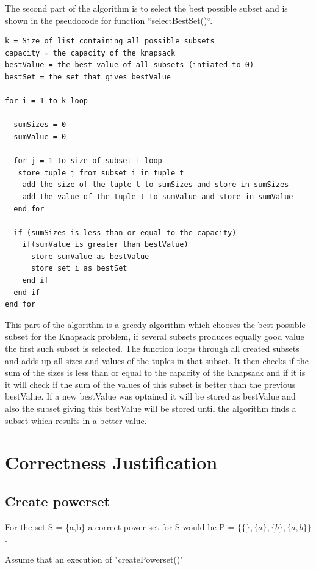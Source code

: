 \documentclass{inc/mas}
\begin{document}
The second part of the algorithm is to select the best possible subset and is shown in the pseudocode for function ``selectBestSet()``.\\

\begin{lstlisting}
k = Size of list containing all possible subsets
capacity = the capacity of the knapsack
bestValue = the best value of all subsets (intiated to 0)
bestSet = the set that gives bestValue

for i = 1 to k loop

  sumSizes = 0
  sumValue = 0

  for j = 1 to size of subset i loop
   store tuple j from subset i in tuple t
    add the size of the tuple t to sumSizes and store in sumSizes
    add the value of the tuple t to sumValue and store in sumValue
  end for

  if (sumSizes is less than or equal to the capacity)
    if(sumValue is greater than bestValue)
      store sumValue as bestValue
      store set i as bestSet
    end if
  end if
end for
\end{lstlisting}

\noindent This part of the algorithm is a greedy algorithm which chooses the best possible subset for the Knapsack problem, if several subsets produces equally good value the first such subset is selected. The function loops through all created subsets and adds up all sizes and values of the tuples in that subset. It then checks if the sum of the sizes is less than or equal to the capacity of the Knapsack and if it is it will check if the sum of the values of this subset is better than the previous bestValue. If a new bestValue was optained it will be stored as bestValue and also the subset giving this bestValue will be stored until the algorithm finds a subset which results in a better value.\\

\section{Correctness Justification}

\subsection{Create powerset}

For the set S = \{a,b\} a correct power set for S would be P = $\{\{\},\{a\},\{b\},\{a,b\}\}$.

Assume that an execution of "createPowerset()"
\end{document}
